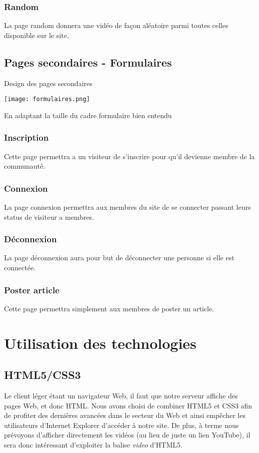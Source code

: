 \documentclass{article}
\begin{document}
\subsubsection{Random}
La page random donnera une vidéo de façon aléatoire parmi toutes celles disponible sur le site.
\newpage
\subsection{Pages secondaires - Formulaires}
\begin{center}
Design des pages secondaires
\end{center}
\texttt{[image: formulaires.png]}


En adaptant la taille du cadre formulaire bien entendu
\subsubsection{Inscription}
Cette page permettra a un visiteur de s'inscrire pour qu'il devienne membre de la communauté.

\subsubsection{Connexion}
La page connexion permettra aux membres du site de se connecter passant leurs status de visiteur a membres.

\subsubsection{Déconnexion}
La page déconnexion aura pour but de déconnecter une personne si elle est connectée.

\subsubsection{Poster article}
Cette page permettra simplement aux membres de poster un article.

\newpage
\section{Utilisation des technologies}

\subsection{HTML5/CSS3}
Le client léger étant un navigateur Web, il faut que notre serveur affiche des pages Web, et donc HTML. Nous avons choisi de combiner HTML5 et CSS3 afin de profiter des dernières avancées dans le secteur du Web et ainsi empêcher les utilisateurs d'Internet Explorer d'accéder à notre site. De plus, à terme nous prévoyons d'afficher directement les vidéos (au lieu de juste un lien YouTube), il sera donc intéressant d'exploiter la balise \emph{video} d'HTML5.
\end{document}
